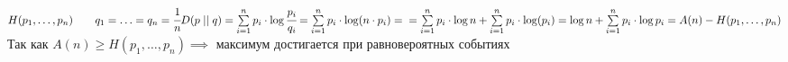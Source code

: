 \documentclass[12pt]{article}
\begin{document}
\subsection{}
$H(p_1,\ldots,p_n)\qquad q_1=\ldots =q_n=\cfrac{1}{n}
D(p\mid \mid q)=\sum\limits_{i=1}^n p_i\cdot \log \cfrac{p_i}{ q_i}=\sum\limits_{i=1}^n p_i\cdot \log (n\cdot p_i)=\\=
\sum\limits_{i=1}^n p_i\cdot \log n+
\sum\limits_{i=1}^n p_i\cdot \log (p_i)=\log n+
\sum\limits_{i=1}^n p_i\cdot \log p_i = A(n)-H(p_1,\ldots,p_n)$\\
Так как $A(n)\geq H(p_1,\ldots,p_n) \implies$ максимум достигается при равновероятных событиях
\end{document}

